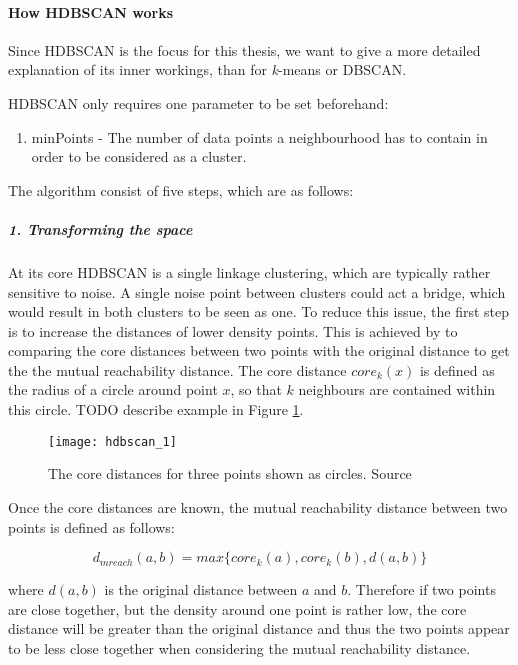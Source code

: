 \paragraph{How HDBSCAN works}

Since HDBSCAN is the focus for this thesis, we want to give a more detailed explanation of its inner workings, than for \textit{k}-means or DBSCAN.

HDBSCAN only requires one parameter to be set beforehand:
\begin{enumerate}
    \item minPoints - The number of data points a neighbourhood has to contain in order to be considered as a cluster.
\end{enumerate}

The algorithm consist of five steps, which are as follows: 

\subparagraph{1. Transforming the space}

At its core HDBSCAN is a single linkage clustering, which are typically rather sensitive to noise.
A single noise point between clusters could act a bridge, which would result in both clusters to be seen as one.
To reduce this issue, the first step is to increase the distances of lower density points.
This is achieved by to comparing the core distances between two points with the original distance to get the the mutual reachability distance.
The core distance $core_k(x)$ is defined as the radius of a circle around point $x$, so that $k$ neighbours are contained within this circle.
TODO describe example in Figure \ref{fig:hdbscan_1}.

\begin{figure}[h]
    \centering
    \texttt{[image: hdbscan\_1]}
    \caption{The core distances for three points shown as circles. Source\cite{how_hdbscan_works}}
    \label{fig:hdbscan_1}
\end{figure}

Once the core distances are known, the mutual reachability distance between two points is defined as follows:

\begin{equation*}
    d_{mreach}(a, b) = max\{core_k(a), core_k(b), d(a, b)\}
\end{equation*}

where $d(a, b)$ is the original distance between $a$ and $b$.
Therefore if two points are close together, but the density around one point is rather low,
the core distance will be greater than the original distance and thus the two points appear to be less close together
when considering the mutual reachability distance.

